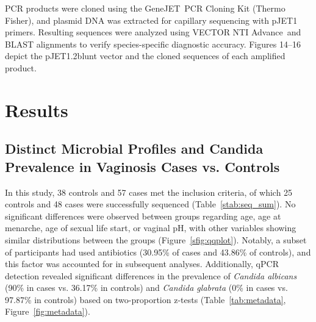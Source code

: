 \documentclass[biotech,article,submit,pdftex,moreauthors]{Definitions/mdpi}
\begin{document}
PCR products were cloned using the GeneJET\texttrademark~PCR Cloning Kit (Thermo Fisher), and plasmid DNA was extracted for capillary sequencing with pJET1 primers. Resulting sequences were analyzed using VECTOR NTI Advance\texttrademark~and BLAST alignments to verify species-specific diagnostic accuracy. Figures 14--16 depict the pJET1.2blunt vector and the cloned sequences of each amplified product.




\section{Results}


\subsection{Distinct Microbial Profiles and Candida Prevalence in Vaginosis Cases vs. Controls}

In this study, 38 controls and 57 cases met the inclusion criteria, of which 25 controls and 48 cases were successfully sequenced (Table~\ref{stab:seq_sum}). No significant differences were observed between groups regarding age, age at menarche, age of sexual life start, or vaginal pH, with other variables showing similar distributions between the groups (Figure~\ref{sfig:qqplot}). Notably, a subset of participants had used antibiotics (30.95\% of cases and 43.86\% of controls), and this factor was accounted for in subsequent analyses. Additionally, qPCR detection revealed significant differences in the prevalence of \textit{Candida albicans} (90\% in cases vs. 36.17\% in controls) and \textit{Candida glabrata} (0\% in cases vs. 97.87\% in controls) based on two-proportion z-tests (Table~\ref{tab:metadata}, Figure~\ref{fig:metadata}).
\end{document}
